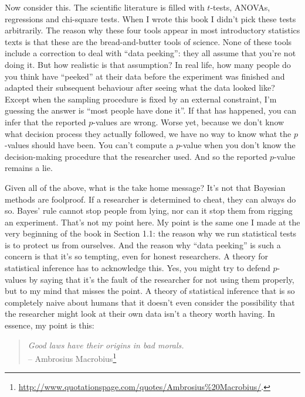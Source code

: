 \documentclass[
  a4paper,
]{book}
\begin{document}
Now consider this. The scientific literature is filled with \(t\)-tests,
ANOVAs, regressions and chi-square tests. When I wrote this book I
didn't pick these tests arbitrarily. The reason why these four tools
appear in most introductory statistics texts is that these are the
bread-and-butter tools of science. None of these tools include a
correction to deal with ``data peeking'': they all assume that you're
not doing it. But how realistic is that assumption? In real life, how
many people do you think have ``peeked'' at their data before the
experiment was finished and adapted their subsequent behaviour after
seeing what the data looked like? Except when the sampling procedure is
fixed by an external constraint, I'm guessing the answer is ``most
people have done it''. If that has happened, you can infer that the
reported \(p\)-values are wrong. Worse yet, because we don't know what
decision process they actually followed, we have no way to know what the
\(p\)-values should have been. You can't compute a \(p\)-value when you
don't know the decision-making procedure that the researcher used. And
so the reported \(p\)-value remains a lie.

Given all of the above, what is the take home message? It's not that
Bayesian methods are foolproof. If a researcher is determined to cheat,
they can always do so. Bayes' rule cannot stop people from lying, nor
can it stop them from rigging an experiment. That's not my point here.
My point is the same one I made at the very beginning of the book in
Section 1.1: the reason why we run statistical tests is to protect us
from ourselves. And the reason why ``data peeking'' is such a concern is
that it's so tempting, even for honest researchers. A theory for
statistical inference has to acknowledge this. Yes, you might try to
defend \(p\)-values by saying that it's the fault of the researcher for
not using them properly, but to my mind that misses the point. A theory
of statistical inference that is so completely naive about humans that
it doesn't even consider the possibility that the researcher might look
at their own data isn't a theory worth having. In essence, my point is
this:

\begin{quote}
\emph{Good laws have their origins in bad morals.}\\
-- Ambrosius Macrobius\footnote{\url{http://www.quotationspage.com/quotes/Ambrosius\%20Macrobius/}.}
\end{quote}
\end{document}
